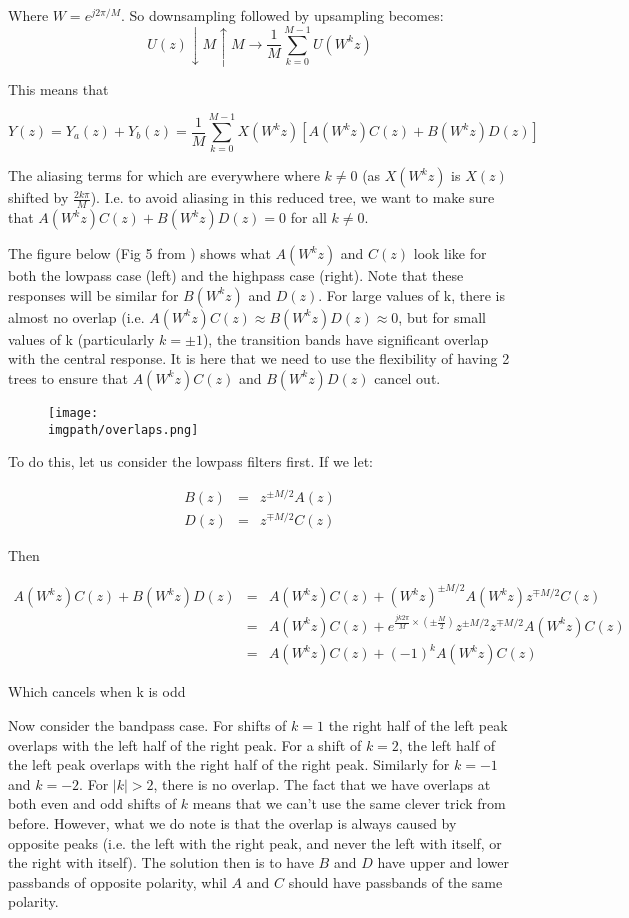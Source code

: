 Where $W=e^{j2\pi/M}$. So downsampling followed by upsampling becomes:
$$U(z) \downarrow M \uparrow M \rightarrow \frac{1}{M}\sum_{k=0}^{M-1}U(W^kz)$$

This means that

  $$Y(z) = Y_{a}(z) + Y_{b}(z) = \frac{1}{M} \sum_{k=0}^{M-1} X(W^k z) [A(W^kz)C(z) + B(W^kz)D(z)]$$

The aliasing terms for which are everywhere where $k \neq 0$ (as $X(W^kz)$ is
$X(z)$ shifted by $\frac{2k\pi}{M}$). I.e. to avoid aliasing in this reduced
tree, we want to make sure that $A(W^kz)C(z) + B(W^kz)D(z) = 0$ for all $k \neq
0$.

The figure below (Fig 5 from \cite{kingsbury_complex_2001}) shows what $A(W^kz)$
and $C(z)$ look like for both the lowpass case (left) and the highpass case
(right). Note that these responses will be similar for $B(W^kz)$ and $D(z)$. For
large values of k, there is almost no overlap (i.e. 
$A(W^kz)C(z) \approx B(W^kz)D(z) \approx 0$, 
but for small values of k (particularly $k = \pm 1$),
the transition bands have significant overlap with the central response. It is
here that we need to use the flexibility of having 2 trees to ensure that
$A(W^kz)C(z)$ and $B(W^kz)D(z)$ cancel out.

\begin{figure}
  \centering
  \texttt{[image: \\imgpath/overlaps.png]}
\end{figure}

To do this, let us consider the lowpass filters first. If we let:

\begin{eqnarray}
  B(z) &=& z^{\pm M/2}A(z) \\
  D(z) &=& z^{\mp M/2}C(z)
\end{eqnarray}

Then

\begin{eqnarray}
  A(W^kz)C(z) + B(W^kz)D(z) &=& A(W^kz)C(z) + (W^kz)^{\pm M/2}A(W^kz) z^{\mp M/2}C(z) \\
  &=& A(W^kz)C(z) + e^{\frac{jk2\pi}{M} \times (\pm \frac{M}{2})} z^{\pm M/2} z^{\mp M/2} A(W^kz)C(z) \\
  &=& A(W^kz)C(z) + (-1)^k A(W^kz)C(z)
\end{eqnarray}

Which cancels when k is odd

Now consider the bandpass case. For shifts of $k=1$ the right half of the left
peak overlaps with the left half of the right peak. For a shift of $k=2$, the
left half of the left peak overlaps with the right half of the right peak.
Similarly for $k=-1$ and $k=-2$. For $|k| > 2$, there is no overlap. The fact
that we have overlaps at both even and odd shifts of $k$ means that we can't use
the same clever trick from before. However, what we do note is that the overlap
is always caused by opposite peaks (i.e. the left with the right peak, and never
the left with itself, or the right with itself). The solution then is to have
$B$ and $D$ have upper and lower passbands of opposite polarity, whil $A$ and
$C$ should have passbands of the same polarity.

